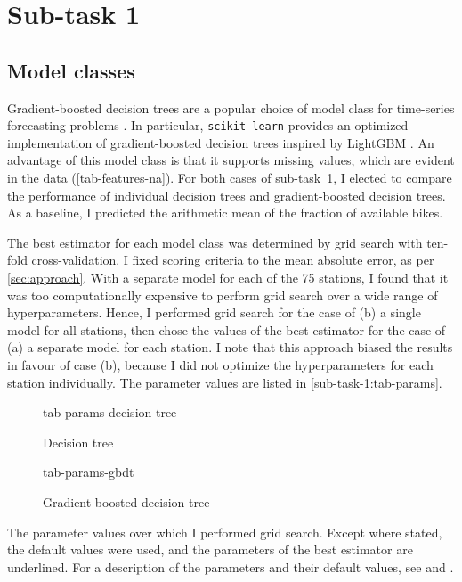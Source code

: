 \section{Sub-task 1}
\label{sec:sub-task-1}

\subsection{Model classes}
\label{sec:sub-task-1:model-classes}

Gradient-boosted decision trees are a popular choice of model class for time-series
forecasting problems \parencite{Bojer2021}.
In particular, \texttt{scikit-learn} provides an optimized implementation of
gradient-boosted decision trees inspired by LightGBM \parencite{Ke2017}.
An advantage of this model class is that it supports missing values, which are evident
in the data (\cref{tab-features-na}).
For both cases of sub-task~1, I elected to compare the performance of individual
decision trees and gradient-boosted decision trees.
As a baseline, I predicted the arithmetic mean of the fraction of available bikes.

The best estimator for each model class was determined by grid search with ten-fold
cross-validation.
I fixed scoring criteria to the mean absolute error, as per \cref{sec:approach}.
With a separate model for each of the 75 stations, I found that it was too
computationally expensive to perform grid search over a wide range of hyperparameters.
Hence, I performed grid search for the case of (b) a single model for all stations,
then chose the values of the best estimator for the case of (a) a separate model for
each station.
I note that this approach biased the results in favour of case (b), because I did not
optimize the hyperparameters for each station individually.
The parameter values are listed in \cref{sub-task-1:tab-params}.

\begin{table}
  \centering
  \begin{subfigure}{\textwidth}
    \centering
    {tab-params-decision-tree}
    \caption{Decision tree}
    \label{sub-task-1:tab-params-decision-tree}
  \end{subfigure}
  \subfigurespace
  \begin{subfigure}{\textwidth}
    \centering
    {tab-params-gbdt}
    \caption{Gradient-boosted decision tree}
    \label{sub-task-1:tab-params-gbdt}
  \end{subfigure}
  \caption{The parameter values over which I performed grid search.
    Except where stated, the default values were used, and the parameters of the best
    estimator are underlined.
    For a description of the parameters and their default values, see
     and
    .
  }
  \label{sub-task-1:tab-params}
\end{table}

